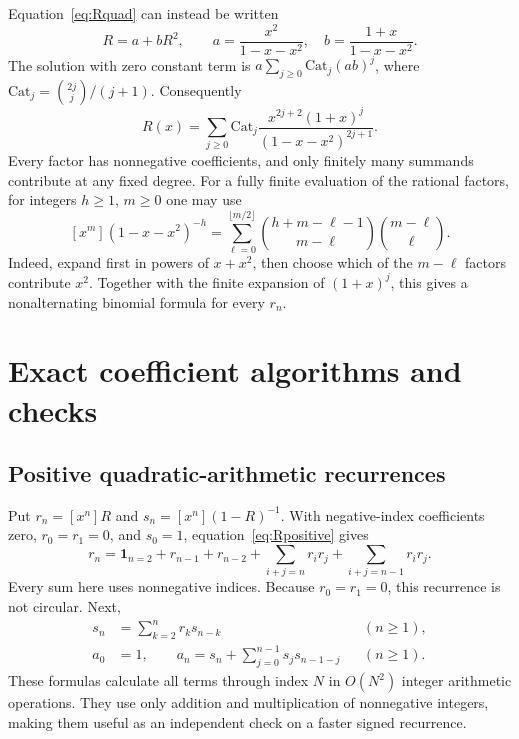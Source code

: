 \documentclass[11pt,a4paper]{article}
\theoremstyle{definition}
\theoremstyle{remark}
\newcommand{\Cat}{\mathrm{Cat}}
\newcommand{\ind}{\mathbf{1}}
\begin{document}
Equation~\eqref{eq:Rquad} can instead be written
\[
 R=a+bR^2,\qquad
 a=\frac{x^2}{1-x-x^2},\quad
 b=\frac{1+x}{1-x-x^2}.
\]
The solution with zero constant term is $a\sum_{j\geq0}\Cat_j(ab)^j$,
where $\Cat_j=\binom{2j}{j}/(j+1)$. Consequently
\begin{equation}\label{eq:positiveCatalan}
 \boxed{\displaystyle
 R(x)=\sum_{j\geq0}\Cat_j
       \frac{x^{2j+2}(1+x)^j}{(1-x-x^2)^{2j+1}}.}
\end{equation}
Every factor has nonnegative coefficients, and only finitely many summands
contribute at any fixed degree. For a fully finite evaluation of the
rational factors, for integers $h\geq1$, $m\geq0$ one may use
\begin{equation}\label{eq:fibonacciPower}
 [x^m](1-x-x^2)^{-h}
 =\sum_{\ell=0}^{\lfloor m/2\rfloor}
   \binom{h+m-\ell-1}{m-\ell}\binom{m-\ell}{\ell}.
\end{equation}
Indeed, expand first in powers of $x+x^2$, then choose which of the
$m-\ell$ factors contribute $x^2$. Together with the finite expansion of
$(1+x)^j$, this gives a nonalternating binomial formula for every $r_n$.

\section{Exact coefficient algorithms and checks}

\subsection{Positive quadratic-arithmetic recurrences}

Put $r_n=[x^n]R$ and $s_n=[x^n](1-R)^{-1}$. With negative-index coefficients
zero, $r_0=r_1=0$, and $s_0=1$, equation~\eqref{eq:Rpositive} gives
\begin{equation}\label{eq:rrecurrence}
 r_n=\ind_{n=2}+r_{n-1}+r_{n-2}
       +\sum_{i+j=n}r_ir_j+\sum_{i+j=n-1}r_ir_j.
\end{equation}
Every sum here uses nonnegative indices. Because $r_0=r_1=0$, this
recurrence is not circular. Next,
\begin{align}
 s_n&=\sum_{k=2}^{n}r_ks_{n-k} &&(n\geq1),\label{eq:srecurrence}\\
 a_0&=1,\qquad
 a_n=s_n+\sum_{j=0}^{n-1}s_js_{n-1-j} &&(n\geq1).\label{eq:arecurrence}
\end{align}
These formulas calculate all terms through index $N$ in $O(N^2)$ integer
arithmetic operations. They use only addition and multiplication of
nonnegative integers, making them useful as an independent check on a
faster signed recurrence.
\end{document}

